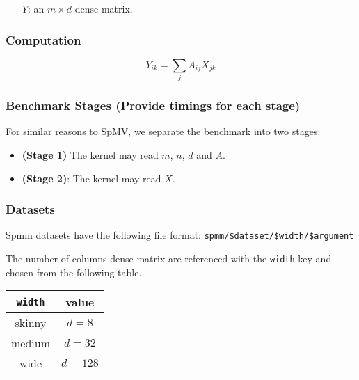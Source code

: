 \documentclass{article}
\begin{document}
\begin{itemize}
	\item[$Y$:] an $m \times d$ dense matrix.
\end{itemize}

\subsubsection{Computation}

$$Y_{ik} = \sum_{j}A_{ij}X_{jk}$$

\subsubsection{Benchmark Stages (Provide timings for each stage)}

For similar reasons to SpMV, we separate the benchmark into two stages:

\begin{itemize}
\item \textbf{(Stage 1)}
	The kernel may read $m$, $n$, $d$ and $A$.
\item \textbf{(Stage 2)}:
	The kernel may read $X$.
\end{itemize}

\subsubsection{Datasets}

    Spmm datasets have the following file format:
    \texttt{spmm/\$dataset/\$width/\$argument}

    The number of columns dense matrix are referenced with the \texttt{width} key and chosen from the following table.
    
    \begin{tabular}{|c|c|}\hline
        \texttt{width} & value\\
        \hline
        skinny & $d = 8$\\
        medium & $d = 32$\\
        wide & $d = 128$\\\hline
    \end{tabular}

\cite{yesil_dense_2022}
\end{document}
